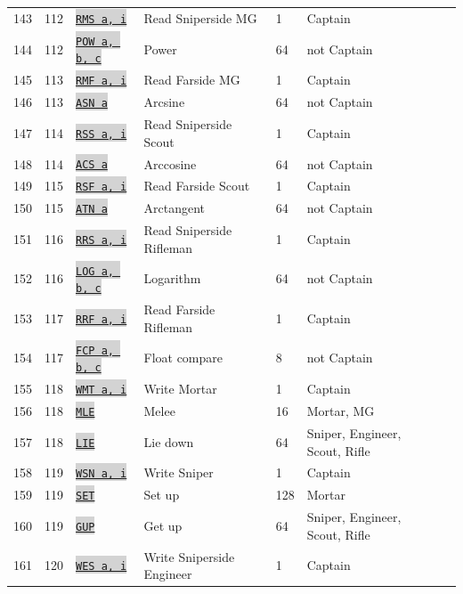 \documentclass{article}
\newcommand{\vnscode}[1]{\colorbox{lightgray}{\lstinline[language=vns]{#1}}}
\begin{document}
\begin{longtable}{lllllll}
    143 & 112 & \hyperref[table:communication]{\vnscode{RMS a, i}} & Read Sniperside MG & 1 & Captain \\
    144 & 112 & \hyperref[table:float]{\vnscode{POW a, b, c}} & Power & 64 & not Captain \\
    145 & 113 & \hyperref[table:communication]{\vnscode{RMF a, i}} & Read Farside MG & 1 & Captain \\
    146 & 113 & \hyperref[table:float]{\vnscode{ASN a}} & Arcsine & 64 & not Captain \\
    147 & 114 & \hyperref[table:communication]{\vnscode{RSS a, i}} & Read Sniperside Scout & 1 & Captain \\
    148 & 114 & \hyperref[table:float]{\vnscode{ACS a}} & Arccosine & 64 & not Captain \\
    149 & 115 & \hyperref[table:communication]{\vnscode{RSF a, i}} & Read Farside Scout & 1 & Captain \\
    150 & 115 & \hyperref[table:float]{\vnscode{ATN a}} & Arctangent & 64 & not Captain \\
    151 & 116 & \hyperref[table:communication]{\vnscode{RRS a, i}} & Read Sniperside Rifleman & 1 & Captain \\
    152 & 116 & \hyperref[table:float]{\vnscode{LOG a, b, c}} & Logarithm & 64 & not Captain \\
    153 & 117 & \hyperref[table:communication]{\vnscode{RRF a, i}} & Read Farside Rifleman & 1 & Captain \\
    154 & 117 & \hyperref[table:float]{\vnscode{FCP a, b, c}} & Float compare & 8 & not Captain \\
    155 & 118 & \hyperref[table:communication]{\vnscode{WMT a, i}} & Write Mortar & 1 & Captain \\
    156 & 118 & \hyperref[table:combat]{\vnscode{MLE}} & Melee & 16 & Mortar, MG \\
    157 & 118 & \hyperref[table:combat]{\vnscode{LIE}} & Lie down & 64 & Sniper, Engineer, Scout, Rifle \\
    158 & 119 & \hyperref[table:communication]{\vnscode{WSN a, i}} & Write Sniper & 1 & Captain \\
    159 & 119 & \hyperref[table:combat]{\vnscode{SET}} & Set up & 128 & Mortar \\
    160 & 119 & \hyperref[table:combat]{\vnscode{GUP}} & Get up & 64 & Sniper, Engineer, Scout, Rifle \\
    161 & 120 & \hyperref[table:communication]{\vnscode{WES a, i}} & Write Sniperside Engineer & 1 & Captain \\

\end{longtable}
\end{document}
